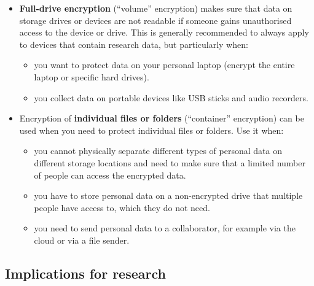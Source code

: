 \documentclass[
]{book}
\providecommand{\tightlist}{%
  \setlength{\itemsep}{0pt}\setlength{\parskip}{0pt}}
\begin{document}
\begin{itemize}
\tightlist
\item
  \textbf{Full-drive encryption} (``volume'' encryption) makes sure that data on
  storage drives or devices are not readable if someone gains unauthorised access
  to the device or drive. This is generally recommended to always apply to
  devices that contain research data, but particularly when:

  \begin{itemize}
  \tightlist
  \item
    you want to protect data on your personal laptop (encrypt the entire laptop
    or specific hard drives).
  \item
    you collect data on portable devices like USB sticks and audio recorders.
  \end{itemize}
\item
  Encryption of \textbf{individual files or folders} (``container'' encryption) can be
  used when you need to protect individual files or folders. Use it when:

  \begin{itemize}
  \tightlist
  \item
    you cannot physically separate different types of personal data on different
    storage locations and need to make sure that a limited number of people can
    access the encrypted data.
  \item
    you have to store personal data on a non-encrypted drive that multiple
    people have access to, which they do not need.
  \item
    you need to send personal data to a collaborator, for example via the cloud
    or via a file sender.
  \end{itemize}
\end{itemize}

\hypertarget{encryption-implications}{%
\subsection{Implications for research}\label{encryption-implications}}
\end{document}
